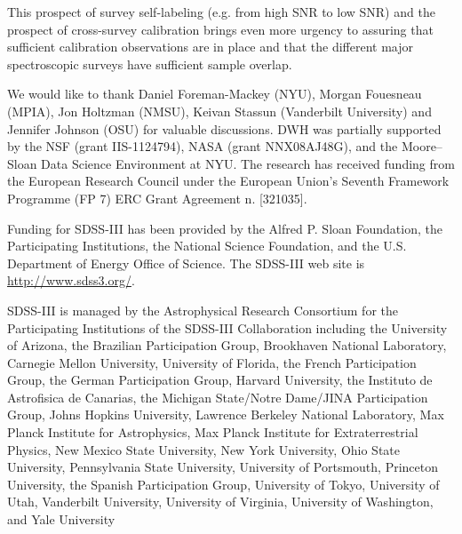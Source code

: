 \documentclass[12pt, preprint]{aastex}
\begin{document}
This prospect of survey self-labeling (e.g. from high SNR to low SNR) and the prospect of cross-survey calibration brings even more urgency to assuring that sufficient calibration observations are in place and that the different major spectroscopic surveys have sufficient sample overlap.

\acknowledgements

We would like to thank Daniel Foreman-Mackey (NYU), 
Morgan Fouesneau (MPIA), Jon Holtzman (NMSU),  Keivan Stassun (Vanderbilt University) and Jennifer Johnson (OSU)
for valuable discussions.
DWH was partially supported by
the NSF (grant IIS-1124794), NASA (grant NNX08AJ48G), and the
Moore--Sloan Data Science Environment at NYU.
The research has received funding from the European Research Council under the European
Union's Seventh Framework Programme (FP 7) ERC Grant Agreement n.
[321035].

Funding for SDSS-III has been provided by the Alfred P. Sloan Foundation, the Participating Institutions, 
the National Science Foundation, and the U.S. Department of Energy Office of Science. The SDSS-III web site is \url{http://www.sdss3.org/}.

SDSS-III is managed by the Astrophysical Research Consortium for the Participating Institutions of the SDSS-III Collaboration
 including the University of Arizona, the Brazilian Participation Group, Brookhaven National Laboratory, Carnegie Mellon University, 
 University of Florida, the French Participation Group, the German Participation Group, Harvard University, the Instituto de Astrofisica 
 de Canarias, the Michigan State/Notre Dame/JINA Participation Group, Johns Hopkins University, Lawrence Berkeley National Laboratory, 
 Max Planck Institute for Astrophysics, Max Planck Institute for Extraterrestrial Physics, New Mexico State University, New York University, 
 Ohio State University, Pennsylvania State University, University of Portsmouth, Princeton University, the Spanish Participation Group, 
 University of Tokyo, University of Utah, Vanderbilt University, University of Virginia, University of Washington, and Yale University
\end{document}
